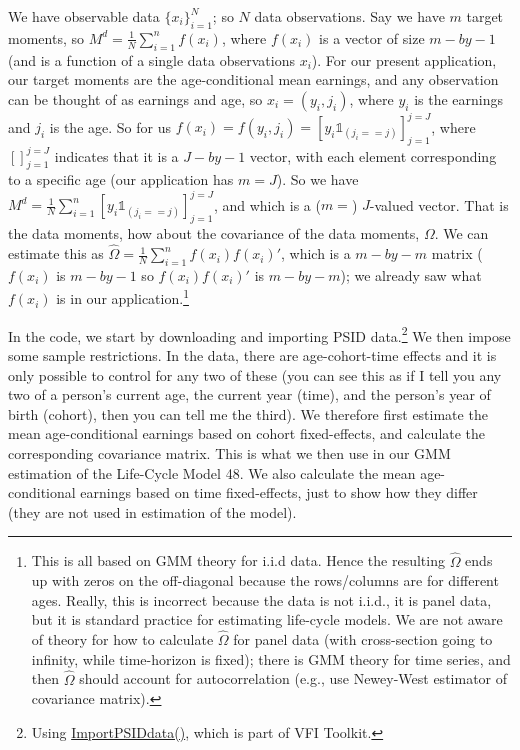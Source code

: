 We have observable data $\{x_i\}_{i=1}^N$; so $N$ data observations. Say we have $m$ target moments, so $M^d=\frac{1}{N}\sum_{i=1}^n f(x_i)$, where $f(x_i)$ is a vector of size $m-by-1$ (and is a function of a single data observations $x_i$). For our present application, our target moments are the age-conditional mean earnings, and any observation can be thought of as earnings and age, so $x_i=(y_i,j_i)$, where $y_i$ is the earnings and $j_i$ is the age. So for us $f(x_i)=f(y_i,j_i)=[y_i \mathbb{1}_{(j_i==j)}]_{j=1}^{j=J}$, where $[]_{j=1}^{j=J}$ indicates that it is a $J-by-1$ vector, with each element corresponding to a specific age (our application has $m=J$). So we have $M^d=\frac{1}{N}\sum_{i=1}^n [y_i \mathbb{1}_{(j_i==j)}]_{j=1}^{j=J}$, and which is a ($m=$) $J$-valued vector. That is the data moments, how about the covariance of the data moments, $\Omega$. We can estimate this as $\hat{\Omega}=\frac{1}{N}\sum_{i=1}^n f(x_i) f(x_i)'$, which is a $m-by-m$ matrix ($f(x_i)$ is $m-by-1$ so $f(x_i) f(x_i)'$ is $m-by-m$); we already saw what $f(x_i)$ is in our application.\footnote{This is all based on GMM theory for i.i.d data. Hence the resulting $\hat{\Omega}$ ends up with zeros on the off-diagonal because the rows/columns are for different ages. Really, this is incorrect because the data is not i.i.d., it is panel data, but it is standard practice for estimating life-cycle models. We are not aware of theory for how to calculate $\hat{\Omega}$ for panel data (with cross-section going to infinity, while time-horizon is fixed); there is GMM theory for time series, and then $\hat{\Omega}$ should account for autocorrelation (e.g., use Newey-West estimator of covariance matrix).}

In the code, we start by downloading and importing PSID data.\footnote{Using \href{https://www.robertdkirkby.com/codes-toolkits/importpsiddata/}{ImportPSIDdata()}, which is part of VFI Toolkit.} We then impose some sample restrictions. In the data, there are age-cohort-time effects and it is only possible to control for any two of these (you can see this as if I tell you any two of a person's current age, the current year (time), and the person's year of birth (cohort), then you can tell me the third). We therefore first estimate the mean age-conditional earnings based on cohort fixed-effects, and calculate the corresponding covariance matrix. This is what we then use in our GMM estimation of the Life-Cycle Model 48. We also calculate the mean age-conditional earnings based on time fixed-effects, just to show how they differ (they are not used in estimation of the model).

